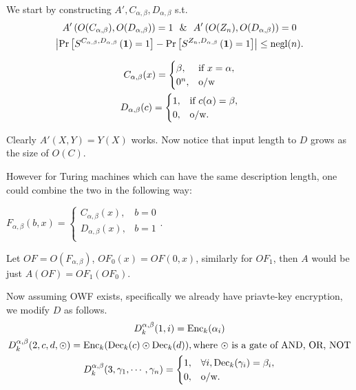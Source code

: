 We start by constructing $A',C_{\alpha,\beta}, D_{\alpha,\beta}$ s.t.
\begin{gather*}
	A'\left( O(C_{\alpha,\beta}), O(D_{\alpha,\beta}) \right) = 1 \ \ \& \ \ A'\left( O(Z_n), O(D_{\alpha,\beta}) \right) = 0\\
	\ABS{\Pr\left[ S^{C_{\alpha,\beta},D_{\alpha,\beta}} \left( \mathbf{1} \right) = 1 \right] - \Pr \left[ S^{Z_n,D_{\alpha,\beta}} \left(\mathbf{1}\right) =1 \right]} \le\mathrm{negl}(n).
\end{gather*}

\begin{gather*}
C_{\alpha,\beta}(x) =
\begin{cases}
	\beta, & \hbox{if } x = \alpha,\\
	0^n, & \hbox{o/w}
\end{cases} \\
D_{\alpha,\beta}(c)=
\begin{cases}
	1,& \hbox{if } c(\alpha) = \beta,\\
	0, & \hbox{o/w}.
\end{cases}
\end{gather*}

Clearly $A'(X,Y) = Y(X)$ works.
Now notice that input length to $D$ grows as the size of $O(C)$.

However for Turing machines which can have the same description length, one could combine the two in the following way:

$F_{\alpha,\beta}(b, x) =
\begin{cases}
	C_{\alpha,\beta}(x), & b=0\\
	D_{\alpha,\beta}(x), & b=1\\
\end{cases}.$

Let $OF= O(F_{\alpha,\beta})$, $OF_0(x) = OF(0,x)$, similarly for $OF_1$, then $A$ would be just $A(OF) = OF_1(OF_0)$.

Now assuming OWF exists, specifically we already have priavte-key encryption, we modify $D$ as follows.
\begin{gather*}
	D_k^{\alpha,\beta}(1,i) = \mathrm{Enc}_k(\alpha_i) \\
	D_k^{\alpha,\beta}(2,c,d,\odot) = \mathrm{Enc}_k(\mathrm{Dec}_k(c) \odot \mathrm{Dec}_k(d)), \hbox{where $\odot$ is a gate of AND, OR, NOT} \\
	D_k^{\alpha,\beta}(3, \gamma_1,\cdots,\gamma_n) =
	\begin{cases}
		1,& \forall i, \mathrm{Dec}_k(\gamma_i) = \beta_i,\\
		0, & \hbox{o/w}.
	\end{cases}
\end{gather*}

